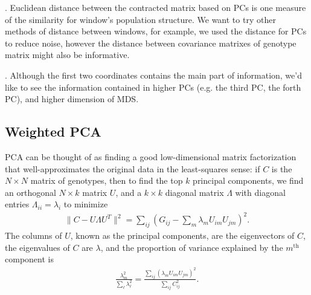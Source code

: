 \documentclass[11pt, oneside]{article}   	%
\begin{document}
. Euclidean distance between the contracted matrix based on PCs is one measure of the similarity for window's population structure.
We want to try other methods of distance between windows, for example, we used the distance for PCs to reduce noise, however the distance between covariance matrixes of genotype matrix might also be informative.

. Although the first two coordinates contains the main part of information, we'd like to see the information contained in higher PCs (e.g. the third PC, the forth PC), and higher dimension of MDS.


  

\appendix

\subsection{Weighted PCA}

PCA can be thought of as finding a good low-dimensional matrix factorization \citep{engelhardt2010analysis}
that well-approximates the original data in the least-squares sense:
if $C$ is the $N \times N$ matrix of genotypes, 
then to find the top $k$ principal components, 
we find an orthogonal $N \times k$ matrix $U$,
and a $k \times k$ diagonal matrix $\Lambda$ with diagonal entries $\Lambda_{ii}=\lambda_i$ to minimize
\begin{align} \label{eqn:objective}
    \| C - U \Lambda U^T \|^2 = \sum_{ij} \left( G_{ij} - \sum_m \lambda_{m} U_{im} U_{jm} \right)^2 .
\end{align}
The columns of $U$, known as the principal components, are the eigenvectors of $C$,
the eigenvalues of $C$ are $\lambda$, and the proportion of variance explained by the $m^\text{th}$ component is
\begin{align*}
    \frac{ \lambda_m^2 }{ \sum_\ell \lambda_\ell^2 } = \frac{ \sum_{ij} ( \lambda_m U_{im} U_{jm} )^2 }{ \sum_{ij} C_{ij}^2 } .
\end{align*}
\end{document}
